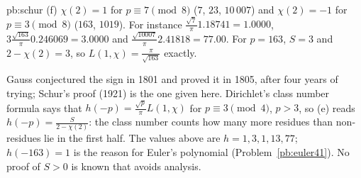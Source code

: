 \begin{solution}{pb:schur}
(f) $\chi(2)=1$ for $p\equiv7\pmod8$ ($7$, $23$, $10\,007$) and $\chi(2)=-1$ for $p\equiv3\pmod8$ ($163$, $1019$). For instance $\frac{\sqrt7}\pi1.18741=1.0000$, $3\frac{\sqrt{163}}\pi0.246069=3.0000$ and
$\frac{\sqrt{10007}}\pi2.41818=77.00$. For $p=163$, $S=3$ and $2-\chi(2)=3$, so $L(1,\chi)=\frac\pi{\sqrt{163}}$ exactly.


\leads Gauss conjectured the sign in 1801 and proved it in 1805, after four years of trying; Schur's proof (1921) is the one given here. Dirichlet's class number formula says that
$h(-p)=\frac{\sqrt p}\pi L(1,\chi)$ for $p\equiv3\pmod4$, $p>3$, so (e) reads $h(-p)=\frac S{2-\chi(2)}$: the class number counts how many more residues than non-residues lie in the first
half. The values above are $h=1,3,1,13,77$; $h(-163)=1$ is the reason for Euler's polynomial (Problem~\ref{pb:euler41}). No proof of $S>0$ is known that avoids analysis.
\end{solution}

